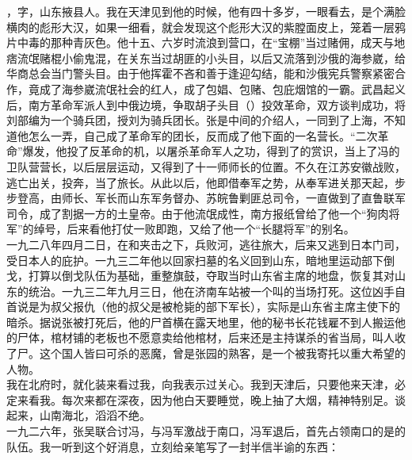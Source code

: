 ，字，山东掖县人。我在天津见到他的时候，他有四十多岁，一眼看去，是个满脸横肉的彪形大汉，如果一细看，就会发现这个彪形大汉的紫膛面皮上，笼着一层鸦片中毒的那种青灰色。他十五、六岁时流浪到营口，在“宝棚”当过赌佣，成天与地痞流氓赌棍小偷鬼混，在关东当过胡匪的小头目，以后又流落到沙俄的海参崴，给华商总会当门警头目。由于他挥霍不吝和善于逢迎勾结，能和沙俄宪兵警察紧密合作，竟成了海参崴流氓社会的红人，成了包娼、包赌、包庇烟馆的一霸。武昌起义后，南方革命军派人到中俄边境，争取胡子头目（）投效革命，双方谈判成功，将刘部编为一个骑兵团，授刘为骑兵团长。张是中间的介绍人，一同到了上海，不知道他怎么一弄，自己成了革命军的团长，反而成了他下面的一名营长。“二次革命”爆发，他投了反革命的机，以屠杀革命军人之功，得到了的赏识，当上了冯的卫队营营长，以后层层运动，又得到了十一师师长的位置。不久在江苏安徽战败，逃亡出关，投奔，当了旅长。从此以后，他即借奉军之势，从奉军进关那天起，步步登高，由师长、军长而山东军务督办、苏皖鲁剿匪总司令，一直做到了直鲁联军司令，成了割据一方的土皇帝。由于他流氓成性，南方报纸曾给了他一个“狗肉将军”的绰号，后来看他打仗一败即跑，又给了他一个“长腿将军”的别名。\\

一九二八年四月二日，在和夹击之下，兵败河，逃往旅大，后来又逃到日本门司，受日本人的庇护。一九三二年他以回家扫墓的名义回到山东，暗地里运动部下倒戈，打算以倒戈队伍为基础，重整旗鼓，夺取当时山东省主席的地盘，恢复其对山东的统治。一九三二年九月三日，他在济南车站被一个叫的当场打死。这位凶手自首说是为叔父报仇（他的叔父是被枪毙的部下军长），实际是山东省主席主使下的暗杀。据说张被打死后，他的尸首横在露天地里，他的秘书长花钱雇不到人搬运他的尸体，棺材铺的老板也不愿意卖给他棺材，后来还是主持谋杀的省当局，叫人收了尸。这个国人皆曰可杀的恶魔，曾是张园的熟客，是一个被我寄托以重大希望的人物。\\

我在北府时，就化装来看过我，向我表示过关心。我到天津后，只要他来天津，必定来看我。每次来都在深夜，因为他白天要睡觉，晚上抽了大烟，精神特别足。谈起来，山南海北，滔滔不绝。\\

一九二六年，张吴联合讨冯，与冯军激战于南口，冯军退后，首先占领南口的是的队伍。我一听到这个好消息，立刻给亲笔写了一封半信半谕的东西：\\

